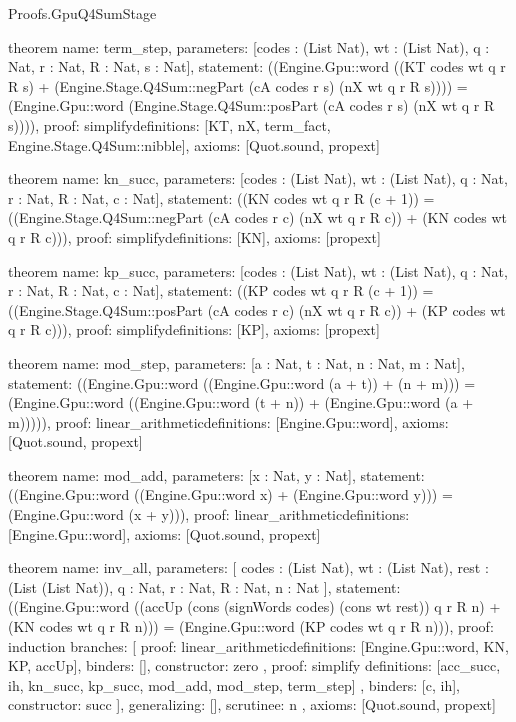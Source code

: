 \begin{lexlean}{Proofs.GpuQ4SumStage}
\begin{semanticmodule}
theorem{
  name: term_step,
  parameters: [codes : (List Nat), wt : (List Nat), q : Nat, r : Nat, R : Nat, s : Nat],
  statement: ((Engine.Gpu::word ((KT codes wt q r R s) + (Engine.Stage.Q4Sum::negPart (cA codes r s) (nX wt q r R s)))) = (Engine.Gpu::word (Engine.Stage.Q4Sum::posPart (cA codes r s) (nX wt q r R s)))),
  proof: simplify{definitions: [KT, nX, term_fact, Engine.Stage.Q4Sum::nibble]},
  axioms: [Quot.sound, propext]
}

theorem{
  name: kn_succ,
  parameters: [codes : (List Nat), wt : (List Nat), q : Nat, r : Nat, R : Nat, c : Nat],
  statement: ((KN codes wt q r R (c + 1)) = ((Engine.Stage.Q4Sum::negPart (cA codes r c) (nX wt q r R c)) + (KN codes wt q r R c))),
  proof: simplify{definitions: [KN]},
  axioms: [propext]
}

theorem{
  name: kp_succ,
  parameters: [codes : (List Nat), wt : (List Nat), q : Nat, r : Nat, R : Nat, c : Nat],
  statement: ((KP codes wt q r R (c + 1)) = ((Engine.Stage.Q4Sum::posPart (cA codes r c) (nX wt q r R c)) + (KP codes wt q r R c))),
  proof: simplify{definitions: [KP]},
  axioms: [propext]
}

theorem{
  name: mod_step,
  parameters: [a : Nat, t : Nat, n : Nat, m : Nat],
  statement: ((Engine.Gpu::word ((Engine.Gpu::word (a + t)) + (n + m))) = (Engine.Gpu::word ((Engine.Gpu::word (t + n)) + (Engine.Gpu::word (a + m))))),
  proof: linear_arithmetic{definitions: [Engine.Gpu::word]},
  axioms: [Quot.sound, propext]
}

theorem{
  name: mod_add,
  parameters: [x : Nat, y : Nat],
  statement: ((Engine.Gpu::word ((Engine.Gpu::word x) + (Engine.Gpu::word y))) = (Engine.Gpu::word (x + y))),
  proof: linear_arithmetic{definitions: [Engine.Gpu::word]},
  axioms: [Quot.sound, propext]
}

theorem{
  name: inv_all,
  parameters: [
    codes : (List Nat),
    wt : (List Nat),
    rest : (List (List Nat)),
    q : Nat,
    r : Nat,
    R : Nat,
    n : Nat
  ],
  statement: ((Engine.Gpu::word ((accUp (cons (signWords codes) (cons wt rest)) q r R n) + (KN codes wt q r R n))) = (Engine.Gpu::word (KP codes wt q r R n))),
  proof: induction{
    branches: [
      {
        proof: linear_arithmetic{definitions: [Engine.Gpu::word, KN, KP, accUp]},
        binders: [],
        constructor: zero
      },
      {
        proof: simplify{
          definitions: [acc_succ, ih, kn_succ, kp_succ, mod_add, mod_step, term_step]
        },
        binders: [c, ih],
        constructor: succ
      }
    ],
    generalizing: [],
    scrutinee: n
  },
  axioms: [Quot.sound, propext]
}


\end{semanticmodule}
\end{lexlean}
